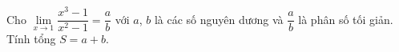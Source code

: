 \begin{ex}
Cho $\lim\limits_{x\to1}\dfrac{x^3-1}{x^2-1}=\dfrac ab$ với $a$, $b$ là các số nguyên dương và $\dfrac ab$ là phân số tối giản. Tính tổng $S=a+b$.
\end{ex}
